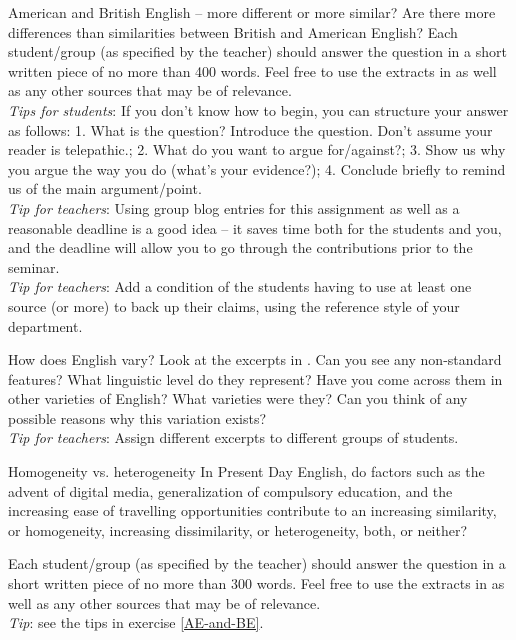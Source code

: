 \begin{exercises}{American and British English -- more different or more similar?}\label{AE-and-BE}
Are there more differences than similarities between British and American English? Each student/group (as specified by the teacher) should answer the question in a short written piece of no more than 400 words. Feel free to use the extracts in  as well as any other sources that may be of relevance.\\

\noindent\emph{Tips for students}: If you don't know how to begin, you can structure your answer as follows: 1. What is the question? Introduce the question. Don't assume your reader is telepathic.; 2. What do you want to argue for/against?; 3. Show us why you argue the way you do (what's your evidence?); 4. Conclude briefly to remind us of the main argument/point.\\

\noindent\emph{Tip for teachers}: Using group blog entries for this assignment as well as a reasonable deadline is a good idea -- it saves time both for the students and you, and the deadline will allow you to go through the contributions prior to the seminar.\\


\noindent\emph{Tip for teachers}: Add a condition of the students having to use at least one source (or more) to back up their claims, using the reference style of your department.
\end{exercises}

\begin{exercises}{How does English vary?}
\chili{}
Look at the excerpts in . Can you see any non-standard features? What linguistic level do they represent? Have you come across them in other varieties of English? What varieties were they? Can you think of any possible reasons why this variation exists?\\

\noindent\emph{Tip for teachers}: Assign different excerpts to different groups of students.
\end{exercises}

\begin{exercises}{Homogeneity vs. heterogeneity}
\chili{}
In Present Day English, do factors such as the advent of digital media, generalization of compulsory education, and the increasing ease of travelling opportunities contribute to an increasing similarity, or homogeneity, increasing dissimilarity, or heterogeneity, both, or neither? 

Each student/group (as specified by the teacher) should answer the question in a short written piece of no more than 300 words. Feel free to use the extracts in  as well as any other sources that may be of relevance.\\

\noindent\emph{Tip}: see the tips in exercise \ref{AE-and-BE}.
\end{exercises}

